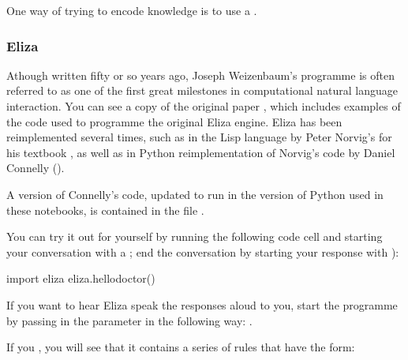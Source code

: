 \documentclass[letterpaper,10pt,english]{sphinxmanual}
\begin{document}
One way of  trying to encode knowledge is to use a .


\subsubsection{Eliza}
\label{\detokenize{content/03_Robot_Lab/Section_00_04:Eliza}}
Athough written fifty or so years ago, Joseph Weizenbaum’s  programme is often referred to as one of the first great milestones in computational natural language interaction. You can see a copy of the original paper , which includes examples of the code used to programme the original Eliza engine. Eliza has been reimplemented several times, such as in the Lisp language by Peter Norvig’s for his textbook , as well as in Python reimplementation of Norvig’s code by Daniel Connelly ().

A version of Connelly’s code, updated to run in the version of Python used in these notebooks, is contained in the file .

You can try it out for yourself by running the following code cell and starting your conversation with a ; end the conversation by starting your response with ):

{
\begin{sphinxVerbatim}[commandchars=\\\{\}]
\llap{\color{nbsphinxin}[ ]:\,\hspace{\fboxrule}\hspace{\fboxsep}}import eliza
eliza.hello\PYGZus{}doctor()
\end{sphinxVerbatim}
}

If you want to hear Eliza speak the responses aloud to you, start the programme by passing in the parameter  in the following way: .

If you , you will see that it contains a series of rules that have the form:
\end{document}
